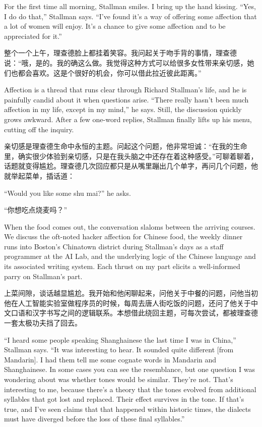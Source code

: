 \ifdefined\eng
For the first time all morning, Stallman smiles. I bring up the hand kissing. ``Yes, I do do that,'' Stallman says. ``I've found it's a way of offering some affection that a lot of women will enjoy. It's a chance to give some affection and to be appreciated for it.''
\fi

\ifdefined\chs
整个一个上午，理查德脸上都挂着笑容。我问起关于吻手背的事情，理查德说：“哦，是的。我的确这么做。我觉得这种方式可以给很多女性带来亲切感，她们也都会喜欢。这是个很好的机会，你可以借此拉近彼此距离。”
\fi

\ifdefined\eng
Affection is a thread that runs clear through Richard Stallman's life, and he is painfully candid about it when questions arise. ``There really hasn't been much affection in my life, except in my mind,'' he says. Still, the discussion quickly grows awkward. After a few one-word replies, Stallman finally lifts up his menu, cutting off the inquiry.
\fi

\ifdefined\chs
亲切感是理查德生命中永恒的主题。问起这个问题，他非常坦诚：“在我的生命里，确实很少体验到亲切感，只是在我头脑之中还存在着这种感受。”可聊着聊着，话题就变得尴尬。理查德几次回应都只是从嘴里蹦出几个单字，再问几个问题，他就举起菜单，插话道：
\fi

\ifdefined\eng
``Would you like some shu mai?'' he asks.
\fi

\ifdefined\chs
“你想吃点烧麦吗？”
\fi

\ifdefined\eng
When the food comes out, the conversation slaloms between the arriving courses. We discuss the oft-noted hacker affection for Chinese food, the weekly dinner runs into Boston's Chinatown district during Stallman's days as a staff programmer at the AI Lab, and the underlying logic of the Chinese language and its associated writing system. Each thrust on my part elicits a well-informed parry on Stallman's part.
\fi

\ifdefined\chs
上菜间隙，谈话越显尴尬。我开始和他闲聊起来，问他关于中餐的问题，问他当初他在人工智能实验室做程序员的时候，每周去唐人街吃饭的问题，还问了他关于中文口语和汉字书写之间的逻辑联系。本想借此绕回主题，可每次尝试，都被理查德一套太极功夫挡了回去。
\fi

\ifdefined\eng
``I heard some people speaking Shanghainese the last time I was in China,'' Stallman says. ``It was interesting to hear. It sounded quite different [from Mandarin]. I had them tell me some cognate words in Mandarin and Shanghainese. In some cases you can see the resemblance, but one question I was wondering about was whether tones would be similar. They're not. That's interesting to me, because there's a theory that the tones evolved from additional syllables that got lost and replaced. Their effect survives in the tone. If that's true, and I've seen claims that that happened within historic times, the dialects must have diverged before the loss of these final syllables.''
\fi

